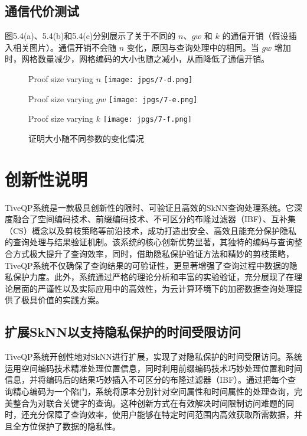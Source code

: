 \documentclass{cumcmthesis}
\numberwithin{equation}{section} %
\numberwithin{figure}{section} %
\numberwithin{table}{section} %
\begin{document}
\subsection{通信代价测试}
图5.4(a)、5.4(b)和5.4(c)分别展示了关于不同的 \(n\)、\(gw\) 和 \(k\) 的通信开销（假设插入相关图片）。通信开销不会随 \(n\) 变化，原因与查询处理中的相同。当 \(gw\) 增加时，网格数量减少，网格编码的大小也随之减小，从而降低了通信开销。

\begin{figure}[h]
    \centering
    \begin{subcaptionbox}{Proof size varying \(n\)}
        {\texttt{[image: jpgs/7-d.png]}}
    \end{subcaptionbox}
    \hspace{10pt}
    \begin{subcaptionbox}{Proof size varying \(gw\)}
        {\texttt{[image: jpgs/7-e.png]}}
    \end{subcaptionbox}
    \hspace{10pt}
    \begin{subcaptionbox}{Proof size varying \(k\)}
        {\texttt{[image: jpgs/7-f.png]}}
    \end{subcaptionbox}
    \caption{证明大小随不同参数的变化情况}
    \label{fig:proof_size}
\end{figure}

\newpage
\section{创新性说明}
TiveQP系统是一款极具创新性的限时、可验证且高效的SkNN查询处理系统。它深度融合了空间编码技术、前缀编码技术、不可区分的布隆过滤器（IBF）、互补集（CS）概念以及剪枝策略等前沿技术，成功打造出安全、高效且能充分保护隐私的查询处理与结果验证机制。该系统的核心创新优势显著，其独特的编码与查询整合方式极大提升了查询效率，同时，借助隐私保护验证方法和精妙的剪枝策略，TiveQP系统不仅确保了查询结果的可验证性，更显著增强了查询过程中数据的隐私保护力度。此外，系统通过严格的理论分析和丰富的实验验证，充分展现了在理论层面的严谨性以及实际应用中的高效性，为云计算环境下的加密数据查询处理提供了极具价值的实践方案。

\subsection{扩展SkNN以支持隐私保护的时间受限访问}
TiveQP系统开创性地对SkNN进行扩展，实现了对隐私保护的时间受限访问。系统运用空间编码技术精准处理位置信息，同时利用前缀编码技术巧妙处理位置和时间信息，并将编码后的结果巧妙插入不可区分的布隆过滤器（IBF）。通过把每个查询精心编码为一个陷门，系统将原本分别针对空间属性和时间属性的处理查询，完美整合为对联合关键字的查询。这种创新方式在有效解决时间限制访问难题的同时，还充分保障了查询效率，使用户能够在特定时间范围内高效获取所需数据，并且全方位保护了数据的隐私性。
\end{document}
